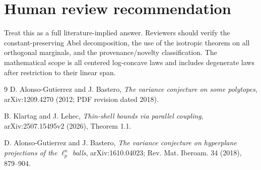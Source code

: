 \documentclass[11pt]{article}
\begin{document}
\section{Human review recommendation}

Treat this as a full literature-implied answer. Reviewers should verify the
constant-preserving Abel decomposition, the use of the isotropic theorem on
all orthogonal marginals, and the provenance/novelty classification. The
mathematical scope is all centered log-concave laws and includes degenerate
laws after restriction to their linear span.

\begin{thebibliography}{9}
D. Alonso-Gutierrez and J. Bastero,
\emph{The variance conjecture on some polytopes},
arXiv:1209.4270 (2012; PDF revision dated 2018).

B. Klartag and J. Lehec,
\emph{Thin-shell bounds via parallel coupling},
arXiv:2507.15495v2 (2026), Theorem 1.1.

D. Alonso-Gutierrez and J. Bastero,
\emph{The variance conjecture on hyperplane projections of the
$\ell_p^n$ balls},
arXiv:1610.04023; Rev. Mat. Iberoam. 34 (2018), 879--904.
\end{thebibliography}
\end{document}
